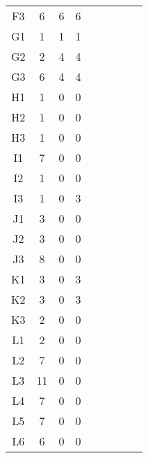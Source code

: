 \begin{center}
\begin{longtable}{ccccc|cccc}
    F3    & 6     & 6     & 6 \\
    G1    & 1     & 1     & 1 \\
    G2    & 2     & 4     & 4 \\
    G3    & 6     & 4     & 4 \\
    H1    & 1     & 0     & 0 \\
    H2    & 1     & 0     & 0 \\
    H3    & 1     & 0     & 0 \\
    I1    & 7     & 0     & 0 \\
    I2    & 1     & 0     & 0 \\
    I3    & 1     & 0     & 3 \\
    J1    & 3     & 0     & 0 \\
    J2    & 3     & 0     & 0 \\
    J3    & 8     & 0     & 0 \\
    K1    & 3     & 0     & 3 \\
    K2    & 3     & 0     & 3 \\
    K3    & 2     & 0     & 0 \\
    L1    & 2     & 0     & 0 \\
    L2    & 7     & 0     & 0 \\
    L3    & 11    & 0     & 0 \\
    L4    & 7     & 0     & 0 \\
    L5    & 7     & 0     & 0 \\
    L6    & 6     & 0     & 0 \\
\end{longtable}
\end{center}

